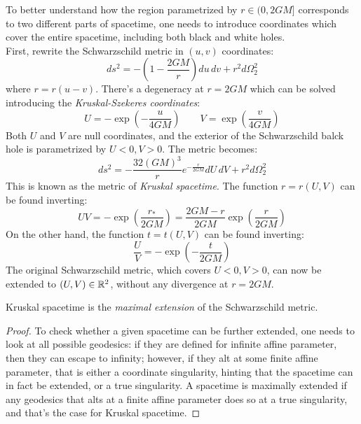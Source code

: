To better understand how the region parametrized by $ r \in (0, 2GM] $ corresponds to two different parts of spacetime, one needs to introduce coordinates which cover the entire spacetime, including both black and white holes.\\
First, rewrite the Schwarzschild metric in $ (u,v) $ coordinates:
\begin{equation*}
  ds^2 = - \left( 1 - \frac{2GM}{r} \right) du\,dv + r^2 d\Omega_2^2
\end{equation*}
where $ r = r(u - v) $. There's a degeneracy at $ r = 2GM $ which can be solved introducing the \textit{Kruskal-Szekeres coordinates}:
\begin{equation}
  U = - \exp \left( - \frac{u}{4GM} \right)
  \qquad
  V = \exp \left( \frac{v}{4GM} \right)
  \label{eq:6.8}
\end{equation}
Both $ U $ and $ V $ are null coordinates, and the exterior of the Schwarzschild balck hole is parametrized by $ U < 0, V > 0 $. The metric becomes:
\begin{equation}
  ds^2 = - \frac{32 (GM)^3}{r} e^{-\frac{r}{2GM}} dU\,dV + r^2 d\Omega_2^2
  \label{eq:6.9}
\end{equation}
This is known as the metric of \textit{Kruskal spacetime}. The function $ r = r(U,V) $ can be found inverting:
\begin{equation}
  UV = - \exp \left( \frac{r_*}{2GM} \right) = \frac{2GM - r}{2GM} \exp \left( \frac{r}{2GM} \right)
  \label{eq:6.10}
\end{equation}
On the other hand, the function $ t = t(U,V) $ can be found inverting:
\begin{equation}
  \frac{U}{V} = - \exp \left( - \frac{t}{2GM} \right)
  \label{eq:6.11}
\end{equation}
The original Schwarzschild metric, which covers $ U < 0, V > 0 $, can now be extended to $ (U,V) \in \mathbb{R}^2 $, without any divergence at $ r = 2GM $.

\begin{proposition}
  Kruskal spacetime is the \textit{maximal extension} of the Schwarzschild metric.
\end{proposition}
\begin{proof}
  To check whether a given spacetime can be further extended, one needs to look at all possible geodesics: if they are defined for infinite affine parameter, then they can escape to infinity; however, if they alt at some finite affine parameter, that is either a coordinate singularity, hinting that the spacetime can in fact be extended, or a true singularity. A spacetime is maximally extended if any geodesics that alts at a finite affine parameter does so at a true singularity, and that's the case for Kruskal spacetime.
\end{proof}

